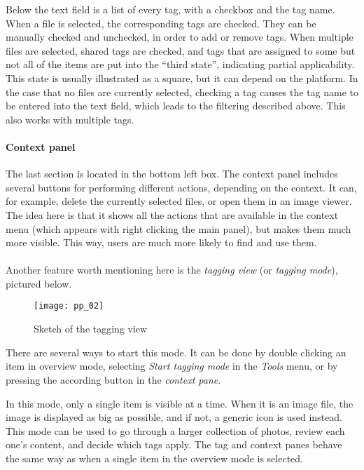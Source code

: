 Below the text field is a list of every tag, with a checkbox and the tag name.
When a file is selected, the corresponding tags are checked. They can be
manually checked and unchecked, in order to add or remove tags. When multiple
files are selected, shared tags are checked, and tags that are assigned to some
but not all of the items are put into the ``third state'', indicating partial
applicability. This state is usually illustrated as a square, but it can depend
on the platform. In the case that no files are currently selected, checking a
tag causes the tag name to be entered into the text field, which leads to the
filtering described above. This also works with multiple tags.

\paragraph{Context panel} The last section is located in the bottom left box.
The context panel includes several buttons for performing different actions,
depending on the context. It can, for example, delete the currently selected
files, or open them in an image viewer. The idea here is that it shows all the
actions that are available in the context menu (which appears with right
clicking the main panel), but makes them much more visible. This way, users are
much more likely to find and use them.

\paragraph{}
Another feature worth mentioning here is the \emph{tagging view} (or
\emph{tagging mode}), pictured below.

\begin{figure}[H]
	\centering
	\texttt{[image: pp\_02]}
	\caption{Sketch of the tagging view}
\end{figure}

There are several ways to start this mode. It can be done by double clicking
an item in overview mode, selecting \emph{Start tagging mode} in the
\emph{Tools} menu, or by pressing the according button in the \emph{context pane}.

In this mode, only a single item is visible at a time.
When it is an image file, the image is displayed as big as
possible, and if not, a generic icon is used instead. This mode can be used to
go through a larger collection of photos, review each one's content, and
decide which tags apply. The tag and context panes behave the same way as
when a single item in the overview mode is selected.


